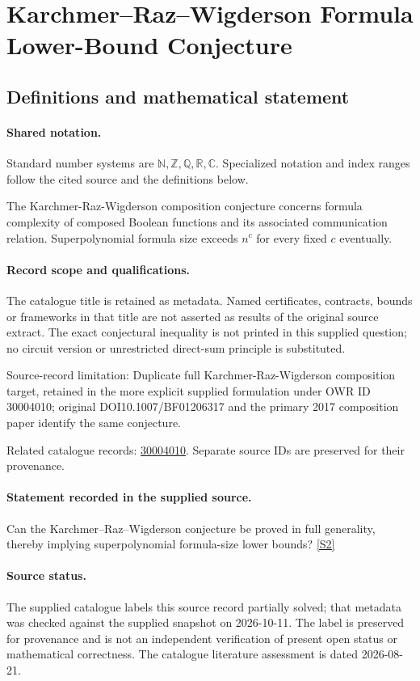 \documentclass[11pt]{article}
\newcommand{\sref}[2]{\hyperlink{source:#1:#2}{[S#2]}}
\begin{document}
\section{Karchmer–Raz–Wigderson Formula Lower-Bound Conjecture}\label{statement}

\subsection{Definitions and mathematical statement}

\paragraph{Shared notation.}Standard number systems are $\mathbb N,\mathbb Z,\mathbb Q,\mathbb R,\mathbb C$. Specialized notation and index ranges follow the cited source and the definitions below.


The Karchmer-Raz-Wigderson composition conjecture concerns formula complexity of composed Boolean functions and its associated communication relation. Superpolynomial formula size exceeds $n^c$ for every fixed $c$ eventually.
\paragraph{Record scope and qualifications.}
The catalogue title is retained as metadata. Named certificates, contracts, bounds or frameworks in that title are not asserted as results of the original source extract.
The exact conjectural inequality is not printed in this supplied question; no circuit version or unrestricted direct-sum principle is substituted.

Source-record limitation: Duplicate full Karchmer-Raz-Wigderson composition target, retained in the more explicit supplied formulation under OWR ID 30004010; original DOI10.1007/BF01206317 and the primary 2017 composition paper identify the same conjecture.

Related catalogue records: \href{https://mehmetmars7.github.io/Erdosproblems-llm-hunter/problem.html?type=open_problems&id=30004010}{30004010}. Separate source IDs are preserved for their provenance.
\paragraph{Statement recorded in the supplied source.}
Can the Karchmer–Raz–Wigderson conjecture be proved in full generality, thereby implying superpolynomial formula-size lower bounds? \sref{statement}{2}
\paragraph{Source status.}
The supplied catalogue labels this source record partially solved; that metadata was checked against the supplied snapshot on 2026-10-11. The label is preserved for provenance and is not an independent verification of present open status or mathematical correctness. The catalogue literature assessment is dated 2026-08-21.
\end{document}
